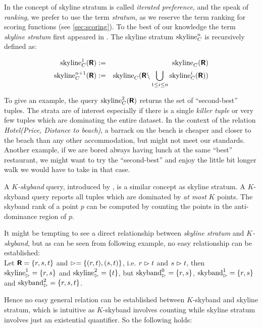 In \citep{Chomicki2003a} the concept of skyline stratum is called
\emph{iterated preference}, and the speak of 
\emph{ranking}, we prefer to use the term
\emph{stratum}, as we reserve the term ranking for
scoring functions (see \autoref{sec:scoring}).
To the best of our knowledge the term \emph{skyline stratum} first 
appeared in \citep{Chan2005}.
The  skyline stratum $\skyline_C^n$ is recursively defined as:

\begin{eqnarray}
\skyline_C^1(\relation{R}) & := & \skyline_C(\relation{R}) \\
\skyline_C^{n+1}(\relation{R}) & := & \skyline_C(\relation{R} \difference \bigunion_{1 \le i \le n} \skyline_C^i(\relation{R}))
\end{eqnarray}

To give an example, the query $\skyline_C^2(\relation{R})$ returns
the set of ``second-best'' tuples.
%
The strata are of interest especially if there is a single
\emph{killer tuple} or very few tuples which are dominating the entire
dataset.  In the context of the relation \emph{Hotel(Price, Distance
to beach)}, a barrack on the beach is cheaper and closer to the beach
than any other accommodation, but might not meet our
standards.  Another example, if we are bored always having lunch at the
same ``best'' restaurant, we might want to try the ``second-best'' and
enjoy the little bit longer walk we would have to take in that case.

A \emph{$K$-skyband} query, introduced by
\citet{Papadias2005}, is a similar concept as skyline stratum. A
$K$-skyband query reports all tuples which are dominated by \emph{at most}
$K$ points.  
The skyband rank of a point $p$ can be computed by counting the points
in the anti-dominance region of $p$.

It might be tempting to see a direct relationship between
\emph{skyline stratum} and \emph{$K$-skyband}, but as can be seen from
following example, no easy relationship can be established: \\
Let $\textnormal{\bf\textsf{R}} = \{r, s, t\}$ and $\vartriangleright =\{(r,t), (s,t)\}$, 
i.e. $r \vartriangleright t$ and $s \vartriangleright t$, 
then $\skyline_\dominates^1 = \{r, s\}$ and $\skyline_\dominates^2 = \{t\}$, 
but $\skyband_\dominates^0 = \{r, s\}$, $\skyband_\dominates^1 = \{r, s\}$ and
$\skyband_\dominates^2 = \{r, s, t\}$.

\noindent
Hence no easy general relation can be established between $K$-skyband
and skyline stratum, which is intuitive as $K$-skyband involves counting
while skyline stratum involves just an existential quantifier.
So the following holds:


